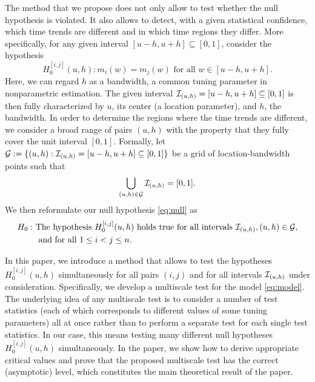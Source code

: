 \documentclass[a4paper,12pt]{article}
\begin{document}
The method that we propose does not only allow to test whether the null hypothesis is violated. It also allows to detect, with a given statistical confidence, which time trends are different and in which time regions they differ. More specifically, for any given interval $[u-h,u+h] \subseteq [0,1]$, consider the hypothesis
\[ H_0^{[i,j]}(u,h): m_i(w) = m_j(w) \text{ for all } w \in [u-h,u+h]. \] 
Here, we can regard $h$ as a bandwidth, a common tuning parameter in nonparametric estimation. The given interval $\mathcal{I}_{(u, h)} = [u-h,u+h] \subseteq [0,1]$ is then fully characterized by $u$, its center (a location parameter), and $h$, the bandwidth. In order to determine the regions where the time trends are different, we consider a broad range of pairs $(u, h)$ with the property that they fully cover the unit interval $[0, 1]$. Formally, let \linebreak $\mathcal{G} := \{(u, h): \mathcal{I}_{(u, h)} = [u-h, u+h] \subseteq [0,1]\}$ be a grid of location-bandwidth points such that %
\begin{align*}
\bigcup_{(u, h) \in \mathcal{G}}  \mathcal{I}_{(u, h)} = [0,1].
\end{align*}
We then reformulate our null hypothesis \eqref{eq:null} as
\begin{align*}
H_0: \ & \text{The hypothesis } H_0^{[i,j]}(u,h) \text{ holds true for all intervals }  \mathcal{I}_{(u, h)}, (u, h) \in \mathcal{G}, \\ & \text{ and for all } 1 \le i < j \le n. 
\end{align*} 

In this paper, we introduce a method that allows to test the hypotheses $H_0^{[i,j]}(u,h)$  simultaneously for all pairs $(i, j)$ and for all intervals $\mathcal{I}_{(u, h)}$ under consideration. Specifically, we develop a multiscale test for the model \eqref{eq:model}. The underlying idea of any multiscale test is to consider a number of test statistics (each of which corresponds to different values of some tuning parameters) all at once rather than to perform a separate test for each single test statistics. In our case, this means testing many different null hypotheses $H_0^{[i,j]}(u,h)$ simultaneously. In the paper, we show how to derive appropriate critical values and prove that the proposed multiscale test has the correct (asymptotic) level, which constitutes the main theoretical result of the paper.
\end{document}
